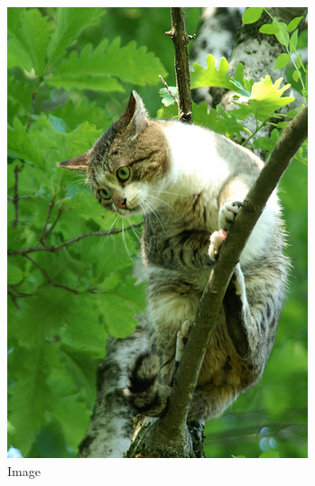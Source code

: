 \documentclass{article} %
\begin{document}
\begin{figure}[tbp]
\centering
\begin{subfigure}[b]{0.109\linewidth}
	\includegraphics[width=\linewidth]{figure/2009_002527.jpg}
	\caption{\footnotesize{Image}}
\end{subfigure}
\begin{subfigure}[b]{0.112\linewidth}

\end{subfigure}
\end{figure}
\end{document}
